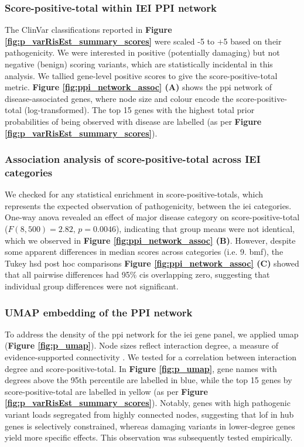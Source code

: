 \subsubsection{Score-positive-total within IEI PPI network}

The ClinVar classifications reported in 
\textbf{Figure \ref{fig:p_varRisEst_summary_scores}} were scaled -5 to +5 based on their pathogenicity. 
We were interested in positive (potentially damaging) but not negative (benign) scoring variants, which are statistically incidental in this analysis. 
We tallied gene-level positive scores to give the score-positive-total metric. 
\textbf{Figure \ref{fig:ppi_network_assoc} (A)} shows the \ac{ppi} network of disease-associated genes, where node size and colour encode the score-positive-total (log-transformed). 
The top 15 genes with the highest total prior probabilities of being observed with disease are labelled (as per \textbf{Figure \ref{fig:p_varRisEst_summary_scores}}).


\FloatBarrier
\subsubsection{Association analysis of score-positive-total across IEI categories} 

We checked for any statistical enrichment in score-positive-totals, which represents the expected observation of pathogenicity, between the \ac{iei} categories.
One-way \ac{anova} revealed an effect of major disease category on score-positive-total (\(F(8,500)=2.82,\,p=0.0046\)), indicating that group means were not identical, which we observed in
\textbf{Figure \ref{fig:ppi_network_assoc} (B)}.
However, despite some apparent differences in median scores across categories (i.e. 9. \ac{bmf}), the Tukey \ac{hsd} post hoc comparisons 
\textbf{Figure \ref{fig:ppi_network_assoc} (C)}
showed that all pairwise differences had 95\% \ac{ci}s overlapping zero, suggesting that individual group differences were not significant.

\FloatBarrier
\subsubsection{UMAP embedding of the PPI  network}
To address the density of the \ac{ppi} network for the \ac{iei} gene panel, we applied \ac{umap} (\textbf{Figure \ref{fig:p_umap}}). 
Node sizes reflect interaction degree, a measure of evidence-supported connectivity \cite{szklarczyk2025string}. We tested for a correlation between interaction degree and score-positive-total. In \textbf{Figure \ref{fig:p_umap}}, gene names with degrees above the 95th percentile are labelled in blue, while the top 15 genes by score-positive-total are labelled in yellow (as per \textbf{Figure \ref{fig:p_varRisEst_summary_scores}}). Notably, genes with high pathogenic variant loads segregated from highly connected nodes, suggesting that \ac{lof} in hub genes is selectively constrained, whereas damaging variants in lower-degree genes yield more specific effects. 
This observation was subsequently tested empirically.

